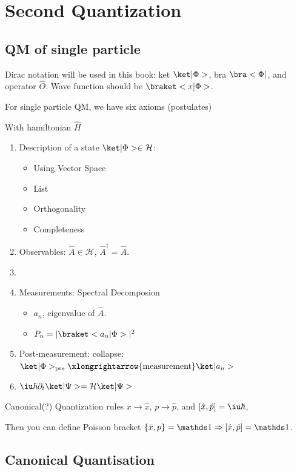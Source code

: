 
\chapter{Second Quantization}

\section{QM of single particle}

Dirac notation will be used in this book: ket $\ket|\Phi>$, bra $\bra<\Phi|$, and operator $\hat O$. Wave function should be $\braket<x|\Phi>$.

For single particle QM, we have six axioms (postulates)

With hamiltonian $\hat H$
\begin{enumerate}
  \item Description of a state $\ket|\Phi> \in \mathcal H$:
  \begin{itemize}
    \item Using Vector Space
    \item List
    \item Orthogonality
    \item Completeness
  \end{itemize}
  \item Observables: $\hat A \in \mathcal H$, $\hat A^\dagger = \hat A$.
  \item \item Measurements: Spectral Decomposion
  \begin{itemize}
    \item $a_n$, eigenvalue of $\hat A$.
    \item $P_n = |\braket<a_n|\Phi>|^2$
  \end{itemize}
  \item Post-measurement: collapse: $\ket|\Phi>_\text{pre} \xlongrightarrow{\text{measurement}} \ket |a_n>$
  \item $\iu\hbar\partial_t\ket|\Psi> = \mathcal H\ket|\Psi>$
\end{enumerate}

Canonical(?) Quantization rules $x \to \hat x$, $p \to \hat p$, and $[\hat x, \hat p] = \iu\hbar$,

Then you can define Poisson bracket $\{\bar x, p\} = \identity \Rightarrow [\hat x, \hat p] = \identity$.

\section{Canonical Quantisation}

